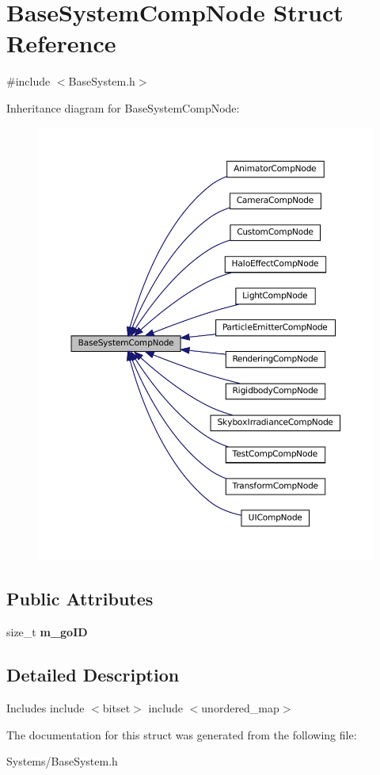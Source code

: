 \hypertarget{structBaseSystemCompNode}{}\section{Base\+System\+Comp\+Node Struct Reference}
\label{structBaseSystemCompNode}


{\ttfamily \#include $<$Base\+System.\+h$>$}



Inheritance diagram for Base\+System\+Comp\+Node\+:\nopagebreak
\begin{figure}[H]
\begin{center}
\leavevmode
\includegraphics[width=350pt]{structBaseSystemCompNode__inherit__graph}
\end{center}
\end{figure}
\subsection*{Public Attributes}
\begin{DoxyCompactItemize}
\item 
\mbox{\label{structBaseSystemCompNode_a5aa946abaae775c0bf3d9388712ee4ef}} 
size\+\_\+t {\bfseries m\+\_\+go\+ID}
\end{DoxyCompactItemize}


\subsection{Detailed Description}
Includes include $<$bitset$>$ include $<$unordered\+\_\+map$>$ 

The documentation for this struct was generated from the following file\+:\begin{DoxyCompactItemize}
\item 
Systems/Base\+System.\+h\end{DoxyCompactItemize}
